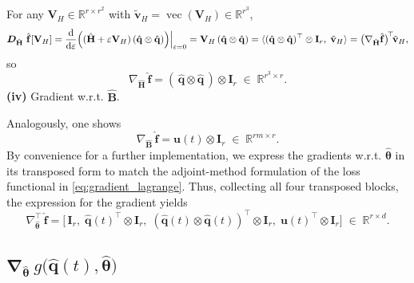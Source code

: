For any $\mathbf{V}_H\in\mathbb{R}^{r\times r^2}$ with $\tilde{\mathbf{v}}_H=\operatorname{vec}(\mathbf{V}_H)\in\mathbb{R}^{r^3}$,\\
$$\bm{D}_{\hat{\mathbf{H}}}~\hat{\mathbf{f}}[\mathbf{V}_H]=\dv{}{\varepsilon}\Bigl((\hat{\mathbf{H}}+\varepsilon\mathbf{V}_H)\,(\hat{\mathbf{q}}\otimes\hat{\mathbf{q}})\Bigr)\Big|_{\varepsilon=0}=\mathbf{V}_H\,(\hat{\mathbf{q}}\otimes\hat{\mathbf{q}})=\langle(\hat{\mathbf{q}}\otimes\hat{\mathbf{q}})^{\top}\otimes\mathbf{I}_r,\;\tilde{\mathbf{v}}_H\rangle=\bigl(\nabla_{\hat{\mathbf{H}}}\hat{\mathbf{f}}\bigr)^{\!\top}\!\tilde{\mathbf{v}}_H,$$
so\\
$$\nabla_{\hat{\mathbf{H}}}\,\hat{\mathbf{f}}=(\,\hat{\mathbf{q}}\otimes\hat{\mathbf{q}}\,)\otimes\mathbf{I}_r\;\in\;\mathbb{R}^{r^3\times r}.$$
\noindent\textbf{(iv)} Gradient w.r.t. $\hat{\mathbf{B}}$.

Analogously, one shows\\
$$\nabla_{\hat{\mathbf{B}}}\,\hat{\mathbf{f}}=\mathbf{u}(t)\otimes\mathbf{I}_r\;\in\;\mathbb{R}^{rm\times r}.$$
By convenience for a further implementation, we express the gradients w.r.t. $\hat{\bm{\theta}}$ in its transposed form to match the adjoint-method formulation of the loss functional in \eqref{eq:gradient_lagrange}.
Thus, collecting all four transposed blocks, the expression for the gradient yields\\
\begin{equation}
  \label{eq:gradient_2}
  \nabla_{\hat{\bm{\theta}}}^{\top}\,\hat{\mathbf{f}}=\bigl[\,\mathbf{I}_r,\;\hat{\mathbf{q}}(t)^{\!\top}\otimes\mathbf{I}_r,\;(\hat{\mathbf{q}}(t)\otimes\hat{\mathbf{q}}(t))^{\!\top}\otimes\mathbf{I}_r,\;\mathbf{u}(t)^{\!\top}\otimes\mathbf{I}_r\bigr]\;\in\;\mathbb{R}^{r\times d}.
\end{equation}


\subsection{$\bm{\nabla}_{\hat{\bm{\theta}}}~g\bigl(\hat{\mathbf{q}}(t), \hat{\bm{\theta}}\bigr)$}

